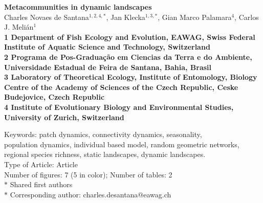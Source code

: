 \documentclass[12pt]{article}
\date{}
\begin{document}
\begin{flushleft}
{\Large
\textbf{Metacommunities in dynamic landscapes}
}
\\
\vspace{1.0cm} Charles Novaes de Santana$^{1,2,4,\ast}$, Jan
Klecka$^{1,3,\ast}$, Gian Marco Palamara$^{4}$, Carlos J. Meli\'an$^{1}$
\\
\vspace{1.0cm} \bf{1} Department of Fish Ecology and Evolution, EAWAG,
Swiss Federal Institute of Aquatic Science and Technology, Switzerland
\\
\bf{2} Programa de Pos-Graduaç\~{a}o em Ciencias da Terra e do Ambiente,
Universidade Estadual de Feira de Santana, Bahia, Brasil
\\
\bf{3} Laboratory of Theoretical Ecology, Institute of Entomology,
Biology Centre of the Academy of Sciences of the Czech Republic, Ceske
Budejovice, Czech Republic\\
\bf{4} Institute of Evolutionary Biology and Environmental Studies, University of Zurich, Switzerland\\
  \vspace{0.5 in}
  
  Keywords: patch dynamics, connectivity dynamics, seasonality,\\
  population dynamics, individual based model, random geometric networks,\\
  regional species richness, static landscapes, dynamic landscapes.\\
  Type of Article: Article\\
  Number of figures: 7 (5 in color); Number of tables: 2\\
$\ast$ Shared first authors\\
$\ast$ Corresponding author: charles.desantana@eawag.ch\\
\end{flushleft}

\newpage
\end{document}

